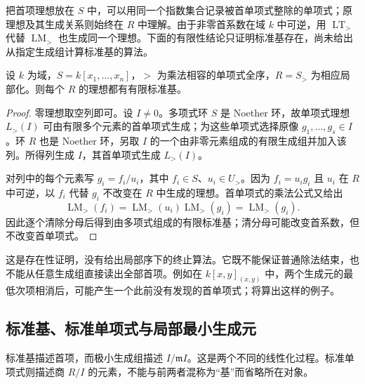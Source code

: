 把首项理想放在 \(S\) 中，可以用同一个指数集合记录被首单项式整除的单项式；原理想及其生成关系则始终在 \(R\) 中理解。由于非零首系数在域 \(k\) 中可逆，用 \(\operatorname{LT}_{>}\) 代替 \(\operatorname{LM}_{>}\) 也生成同一个理想。下面的有限性结论只证明标准基存在，尚未给出从指定生成组计算标准基的算法。

\begin{proposition}\label{b3:prop:F-standard-existence}
	设 \(k\) 为域，\(S=k[x_1,\ldots,x_n]\)，\(>\) 为乘法相容的单项式全序，\(R=S_{>}\) 为相应局部化。则每个 \(R\) 的理想都有有限标准基。
\end{proposition}
\begin{proof}
	零理想取空列即可。设 \(I\ne0\)。多项式环 \(S\) 是 Noether 环，故单项式理想 \(L_{>}(I)\) 可由有限多个元素的首单项式生成；为这些单项式选择原像 \(g_1,\ldots,g_s\in I\)。环 \(R\) 也是 Noether 环，另取 \(I\) 的一个由非零元素组成的有限生成组并加入该列。所得列生成 \(I\)，其首单项式生成 \(L_{>}(I)\)。

	对列中的每个元素写 \(g_i=f_i/u_i\)，其中 \(f_i\in S\)、\(u_i\in U_{>}\)。因为 \(f_i=u_i g_i\) 且 \(u_i\) 在 \(R\) 中可逆，以 \(f_i\) 代替 \(g_i\) 不改变在 \(R\) 中生成的理想。首单项式的乘法公式又给出
	\[
		\operatorname{LM}_{>}(f_i) =\operatorname{LM}_{>}(u_i)\operatorname{LM}_{>}(g_i) =\operatorname{LM}_{>}(g_i).
	\]
	因此逐个清除分母后得到由多项式组成的有限标准基；清分母可能改变首系数，但不改变首单项式。
\end{proof}

这是存在性证明，没有给出局部序下的终止算法。它既不能保证普通除法结束，也不能从任意生成组直接读出全部首项。例如在 \(k[x,y]_{(x,y)}\) 中，两个生成元的最低次项相消后，可能产生一个此前没有发现的首单项式；将算出这样的例子。

\subsection{标准基、标准单项式与局部最小生成元}
\label{b3:subsec:F01:03}

标准基描述首项，而极小生成组描述 \(I/\mathfrak m I\)。这是两个不同的线性化过程。标准单项式则描述商 \(R/I\) 的元素，不能与前两者混称为“基”而省略所在对象。


